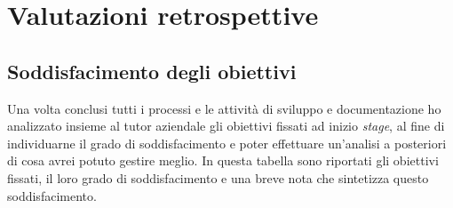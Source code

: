 
\chapter{Valutazioni retrospettive}
\label{cap:valutazioni-retrospettive}

\section{Soddisfacimento degli obiettivi}

Una volta conclusi tutti i processi e le attività di sviluppo e documentazione ho analizzato insieme al tutor aziendale gli obiettivi fissati ad inizio \textit{stage}, al fine di individuarne il grado di soddisfacimento e poter effettuare un'analisi a posteriori di cosa avrei potuto gestire meglio. In questa tabella sono riportati gli obiettivi fissati, il loro grado di soddisfacimento e una breve nota che sintetizza questo soddisfacimento. \\

